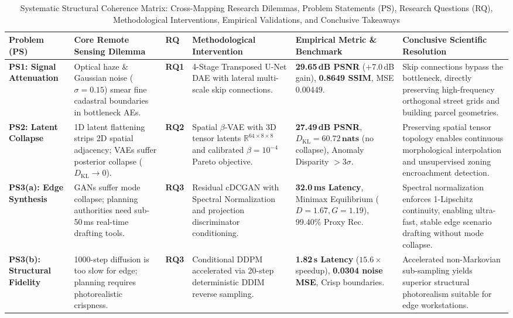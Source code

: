 \documentclass[journal]{IEEEtran}
\begin{document}
\begin{table}[!t]
\caption{Systematic Structural Coherence Matrix: Cross-Mapping Research Dilemmas, Problem Statements (PS), Research Questions (RQ), Methodological Interventions, Empirical Validations, and Conclusive Takeaways}
\label{tab:system_coherence}
\centering
\scriptsize
\renewcommand{\arraystretch}{1.2}
\setlength{\tabcolsep}{4.5pt}
\begin{tabularx}{\textwidth}{@{}l p{2.8cm} l p{3.2cm} p{3.0cm} p{3.8cm}@{}}
\toprule
\textbf{Problem (PS)} & \textbf{Core Remote Sensing Dilemma} & \textbf{RQ} & \textbf{Methodological Intervention} & \textbf{Empirical Metric \& Benchmark} & \textbf{Conclusive Scientific Resolution} \\
\midrule
\textbf{PS1: Signal Attenuation} & Optical haze \& Gaussian noise ($\sigma=0.15$) smear fine cadastral boundaries in bottleneck AEs. & \textbf{RQ1} & 4-Stage Transposed U-Net DAE with lateral multi-scale skip connections. & \textbf{29.65\,dB PSNR} (+7.0\,dB gain), \textbf{0.8649 SSIM}, MSE $0.00449$. & Skip connections bypass the bottleneck, directly preserving high-frequency orthogonal street grids and building parcel geometries. \\
\midrule
\textbf{PS2: Latent Collapse} & 1D latent flattening strips 2D spatial adjacency; VAEs suffer posterior collapse ($D_{\text{KL}}\to 0$). & \textbf{RQ2} & Spatial $\beta$-VAE with 3D tensor latents $\mathbb{R}^{64\times 8\times 8}$ and calibrated $\beta=10^{-4}$ Pareto objective. & \textbf{27.49\,dB PSNR}, $D_{\text{KL}}=\mathbf{60.72\,nats}$ (no collapse), Anomaly Disparity $>3\sigma$. & Preserving spatial tensor topology enables continuous morphological interpolation and unsupervised zoning encroachment detection. \\
\midrule
\textbf{PS3(a): Edge Synthesis} & GANs suffer mode collapse; planning authorities need sub-50\,ms real-time drafting tools. & \textbf{RQ3} & Residual cDCGAN with Spectral Normalization and projection discriminator conditioning. & \textbf{32.0\,ms Latency}, Minimax Equilibrium ($D=1.67, G=1.19$), 99.40\% Proxy Rec. & Spectral normalization enforces 1-Lipschitz continuity, enabling ultra-fast, stable edge scenario drafting without mode collapse. \\
\midrule
\textbf{PS3(b): Structural Fidelity} & 1000-step diffusion is too slow for edge; planning requires photorealistic crispness. & \textbf{RQ3} & Conditional DDPM accelerated via 20-step deterministic DDIM reverse sampling. & \textbf{1.82\,s Latency} ($15.6\times$ speedup), \textbf{0.0304 noise MSE}, Crisp boundaries. & Accelerated non-Markovian sub-sampling yields superior structural photorealism suitable for edge workstations. \\

\end{tabularx}
\end{table}
\end{document}
